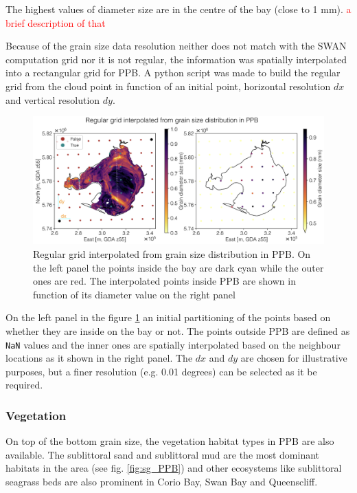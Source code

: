 \documentclass[12pt]{article}
\begin{document}
The highest values of diameter size are in the centre of the bay (close to 1 mm). \textcolor{red}{a brief description of that}

Because of the grain size data resolution neither does not match with the SWAN computation grid nor it is not regular, the information was spatially interpolated into a rectangular grid for PPB. A python script was made to build the regular grid from the cloud point in function of an initial point, horizontal resolution $dx$ and vertical resolution $dy$.

\begin{figure}[h]
    \centering
    \includegraphics[scale=0.45]{plots/maps/interpolated_D.png}
    \caption{Regular grid interpolated from grain size distribution in PPB. On the left panel the points inside the bay are dark cyan while the outer ones are red. The interpolated points inside PPB are shown in function of its diameter value on the right panel}
    \label{fig:interpolated_D}
\end{figure}

On the left panel in the figure \ref{fig:interpolated_D} an initial partitioning of the points based on whether they are inside on the bay or not. The points outside PPB are defined as \verb|NaN| values and the inner ones are spatially interpolated based on the neighbour locations as it shown in the right panel. The $dx$ and $dy$ are chosen for illustrative purposes, but a finer resolution (e.g. 0.01 degrees) can be selected as it be required.

\subsubsection*{Vegetation}

On top of the bottom grain size, the vegetation habitat types in PPB are also available. The sublittoral sand and sublittoral mud are the most dominant habitats in the area (see fig. \ref{fig:sg_PPB}) and other ecosystems like sublittoral seagrass beds are also prominent in Corio Bay, Swan Bay and Queenscliff.
\end{document}
